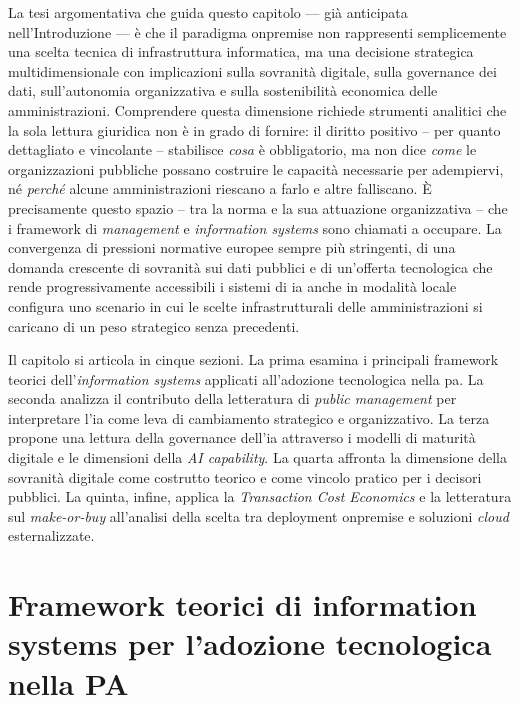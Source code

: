 La tesi argomentativa che guida questo capitolo --- già anticipata nell'Introduzione --- è che il paradigma \gls{onpremise} non rappresenti semplicemente una scelta tecnica di infrastruttura informatica, ma una decisione strategica multidimensionale con implicazioni sulla sovranità digitale, sulla governance dei dati, sull'autonomia organizzativa e sulla sostenibilità economica delle amministrazioni. Comprendere questa dimensione richiede strumenti analitici che la sola lettura giuridica non è in grado di fornire: il diritto positivo -- per quanto dettagliato e vincolante -- stabilisce \textit{cosa} è obbligatorio, ma non dice \textit{come} le organizzazioni pubbliche possano costruire le capacità necessarie per adempiervi, né \textit{perché} alcune amministrazioni riescano a farlo e altre falliscano. È precisamente questo spazio -- tra la norma e la sua attuazione organizzativa -- che i framework di \textit{management} e \textit{information systems} sono chiamati a occupare. La convergenza di pressioni normative europee sempre più stringenti, di una domanda crescente di sovranità sui dati pubblici e di un'offerta tecnologica che rende progressivamente accessibili i sistemi di \gls{ia} anche in modalità locale configura uno scenario in cui le scelte infrastrutturali delle amministrazioni si caricano di un peso strategico senza precedenti.

Il capitolo si articola in cinque sezioni. La prima esamina i principali framework teorici dell'\textit{information systems} applicati all'adozione tecnologica nella \gls{pa}. La seconda analizza il contributo della letteratura di \textit{public management} per interpretare l'\gls{ia} come leva di cambiamento strategico e organizzativo. La terza propone una lettura della governance dell'\gls{ia} attraverso i modelli di maturità digitale e le dimensioni della \textit{AI capability}. La quarta affronta la dimensione della sovranità digitale come costrutto teorico e come vincolo pratico per i decisori pubblici. La quinta, infine, applica la \textit{Transaction Cost Economics} e la letteratura sul \textit{make-or-buy} all'analisi della scelta tra deployment \gls{onpremise} e soluzioni \textit{cloud} esternalizzate.

\section{Framework teorici di information systems per l'adozione tecnologica nella PA}
\label{sec:cap2-framework-is}

